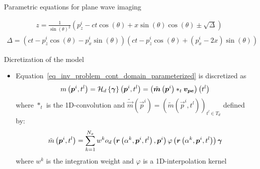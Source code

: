 {\begin{block}{Parametric equations for plane wave imaging}
\begin{itemize}
\begin{align}
		z = \frac{1}{\sin \left(\theta\right)^2} \left(p^i_z - ct \cos \left(\theta\right) + x \sin \left(\theta\right) \cos \left(\theta\right) \pm \sqrt{\Delta} \right)
		\end{align}
		\begin{align*}
		\Delta = \left(ct-p^i_z \cos \left(\theta\right) - p^i_x \sin \left(\theta\right) \right)\left(ct-p^i_z \cos \left(\theta\right) + \left(p^i_x -2 x\right) \sin \left(\theta\right) \right)
		\end{align*}
	\end{itemize}
\end{block}
\begin{block}{Dicretization of the model}
	\begin{itemize}
		\item Equation~\eqref{eq_inv_problem_cont_domain_parameterized} is discretized as
		\begin{align}
		\label{eq_inv_problem_dist_domain_parameterized}
		m\left(\bm{p}^i, t^l\right) = \mathcal{H}_d \left\lbrace \bm{\gamma}\right\rbrace\left(\bm{p}^i, t^l\right) =  \left(\tilde{\bm{m}}\left(\bm{p}^i\right) \ast_t \bm{v_{pe}}\right) \left(t^l\right)
		\end{align}
		where $\ast_t$ is the \num{1}D-convolution and $\tilde{\vec{m}}\left(\vec{p}^i\right) = \left(\tilde{m}\left(\vec{p}^i, t^l\right)\right)_{t^l \in T_d}$ defined by:
		\begin{align}
		\label{eq_m_tilde}
		\tilde{m}\left(\bm{p}^i, t^l\right) = \sum \limits_{k = 1}^{N_x} w^k o_d\left(\bm{r}\left(\alpha^k, \bm{p}^i, t^l\right), \bm{p}^i\right) \varphi \left(\bm{r}\left(\alpha^k, \bm{p}^i, t^l\right)\right) \bm{\gamma}
		\end{align}
		where $w^k$ is the integration weight and $\varphi$ is a \num{1}D-interpolation kernel
	\end{itemize}
\end{block}

}%